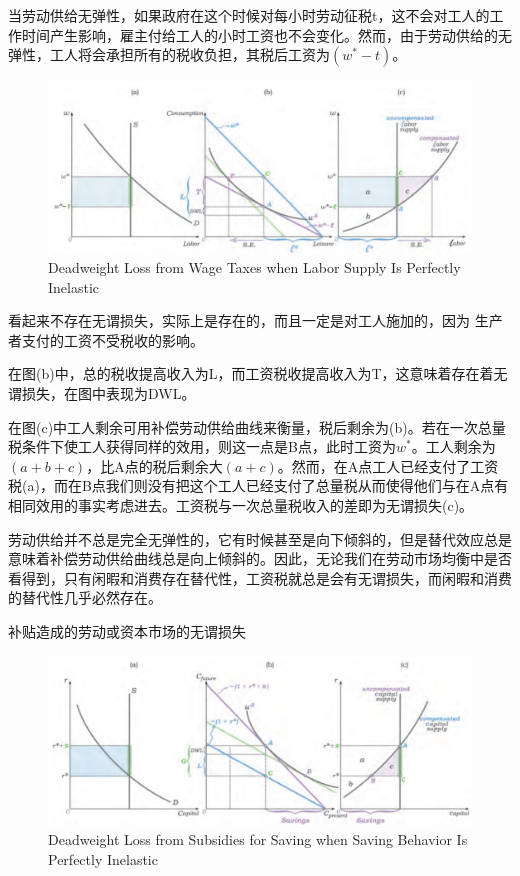 \documentclass{article}
\begin{document}
当劳动供给无弹性，如果政府在这个时候对每小时劳动征税t，这不会对工人的工作时间产生影响，雇主付给工人的小时工资也不会变化。然而，由于劳动供给的无弹性，工人将会承担所有的税收负担，其税后工资为$ (w^*-t) $。

\begin{figure}[H] %
	\centering %
	\includegraphics[width=1\textwidth]{19_5} %
	\caption{Deadweight Loss from Wage Taxes when Labor Supply Is Perfectly Inelastic} %
	\label{Fig.main6} %
\end{figure}

看起来不存在无谓损失，实际上是存在的，而且一定是对工人施加的，因为 生产者支付的工资不受税收的影响。

在图(b)中，总的税收提高收入为L，而工资税收提高收入为T，这意味着存在着无谓损失，在图中表现为DWL。

在图(c)中工人剩余可用补偿劳动供给曲线来衡量，税后剩余为(b)。若在一次总量税条件下使工人获得同样的效用，则这一点是B点，此时工资为$ w^* $。工人剩余为$ (a+b+c) $，比A点的税后剩余大$ (a+c) $。然而，在A点工人已经支付了工资税(a)，而在B点我们则没有把这个工人已经支付了总量税从而使得他们与在A点有相同效用的事实考虑进去。工资税与一次总量税收入的差即为无谓损失(c)。

劳动供给并不总是完全无弹性的，它有时候甚至是向下倾斜的，但是替代效应总是意味着补偿劳动供给曲线总是向上倾斜的。因此，无论我们在劳动市场均衡中是否看得到，只有闲暇和消费存在替代性，工资税就总是会有无谓损失，而闲暇和消费的替代性几乎必然存在。

\hspace*{\fill}

补贴造成的劳动或资本市场的无谓损失

\begin{figure}[H] %
	\centering %
	\includegraphics[width=1\textwidth]{19_6} %
	\caption{Deadweight Loss from Subsidies for Saving when Saving Behavior Is Perfectly Inelastic} %
	\label{Fig.main7} %
\end{figure}
\end{document}
